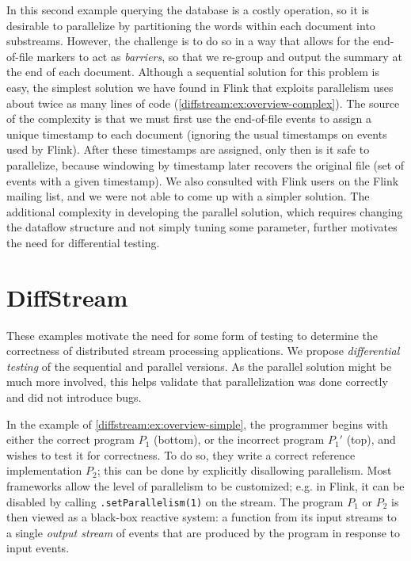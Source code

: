 In this second example querying the database is a costly operation, so
it is desirable to parallelize by partitioning the words within each
document into substreams. However, the challenge is to do so in a way
that allows for the end-of-file markers to act as \emph{barriers}, so
that we re-group and output the summary at the end of each document.
Although a sequential solution for this problem is easy, the simplest
solution we have found in Flink that exploits parallelism uses about
twice as many lines of code
(\cref{diffstream:ex:overview-complex}).
The source of the complexity is that we must first use the end-of-file events to assign a unique timestamp to each document (ignoring the usual timestamps on events used by Flink). After these timestamps are assigned, only then is it safe to parallelize, because windowing by timestamp later recovers the original file (set of events with a given timestamp).
We also consulted with Flink users
on the Flink mailing list, and we were not able to come up with a
simpler solution.
The additional complexity in
developing the parallel solution, which requires changing the dataflow
structure and not simply tuning some parameter, further motivates the
need for differential testing.

\section{DiffStream}
\label{diffstream:ssec:overview-solution}

These examples motivate the need for some form of testing to determine
the correctness of distributed stream processing applications. We propose \emph{differential testing} of the sequential and parallel versions. As the parallel solution might be much more involved, this helps validate that parallelization was done correctly and did not introduce bugs.

In the example of \cref{diffstream:ex:overview-simple}, the programmer begins with either the correct program $P_1$ (bottom), or the incorrect program $P_1'$ (top), and wishes to test it for correctness. To do so, they write a correct reference implementation $P_2$; this can be done by explicitly disallowing parallelism. Most frameworks allow the level of parallelism to be customized; e.g. in Flink, it can be disabled by calling \texttt{.setParallelism(1)} on the stream.
The program $P_1$ or $P_2$ is then viewed as a black-box reactive system: a function from its input streams to a single \emph{output stream} of events that are produced by the program in response to input events.

